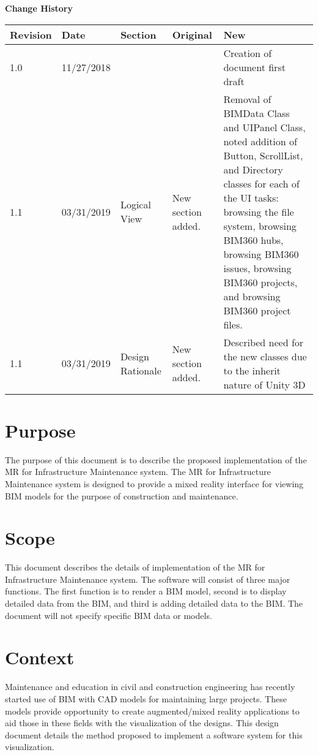 \documentclass[onecolumn, draftclsnofoot,10pt, compsoc]{IEEEtran}
\begin{document}

\tableofcontents
\listoffigures
\clearpage

\textbf{Change History}\par

\begin{tabular}{ p{2cm} p{2cm} p{2cm} p{} p{} }
 \textbf{Revision} & \textbf{Date} & \textbf{Section} & \textbf{Original} & \textbf{New} \\
 \hline
 1.0 & 11/27/2018 & & & Creation of document first draft \\
 \hline
 1.1 & 03/31/2019 & Logical View & New section added. & Removal of BIMData Class and UIPanel Class, noted addition of Button, ScrollList, and Directory classes for each of the UI tasks: browsing the file system, browsing BIM360 hubs, browsing BIM360 issues, browsing BIM360 projects, and browsing BIM360 project files. \\
 \hline
 1.1 & 03/31/2019 & Design Rationale & New section added. & Described need for the new classes due to the inherit nature of Unity 3D
\end{tabular}

\clearpage

\section{Purpose}
The purpose of this document is to describe the proposed implementation of the MR for Infrastructure Maintenance system.
The MR for Infrastructure Maintenance system is designed to provide a mixed reality interface for viewing BIM models for the purpose of construction and maintenance.
\par

\section{Scope}
This document describes the details of implementation of the MR for Infrastructure Maintenance system.
The software will consist of three major functions.
The first function is to render a BIM model, second is to display detailed data from the BIM, and third is adding detailed data to the BIM.
The document will not specify specific BIM data or models.\par

\section{Context}
Maintenance and education in civil and construction engineering has recently started use of BIM with CAD models for maintaining large projects.
These models provide opportunity to create augmented/mixed reality applications to aid those in these fields with the visualization of the designs.
This design document details the method proposed to implement a software system for this visualization.
\par
\end{document}
